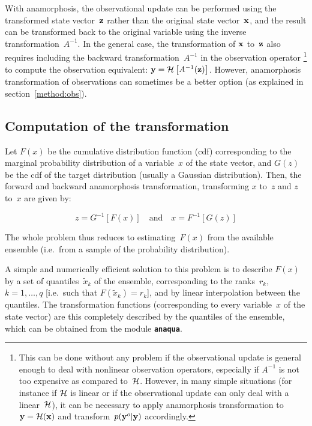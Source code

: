 \documentclass[11pt]{article}
\begin{document}
With anamorphosis, the observational update can be performed using the transformed state vector~${\bf z}$
rather than the original state vector~${\bf x}$, and the result can be transformed back
to the original variable using the inverse transformation~$A^{-1}$.
In the general case, the transformation of ${\bf x}$ to~${\bf z}$ also requires including
the backward transformation~$A^{-1}$ in the observation operator%
\footnote{This can be done without any problem if the observational update is general enough
to deal with nonlinear observation operators,
especially if $A^{-1}$ is not too expensive as compared to~${\cal H}$.
However, in many simple situations (for instance if ${\cal H}$ is linear
or if the observational update can only deal with a linear~${\cal H}$),
it can be necessary to apply anamorphosis transformation to~${\bf y} = {\cal H}({\bf x})$
and transform~$p({\bf y}^o|{\bf y})$ accordingly.}
to compute the observation equivalent: ${\bf y} = {\cal H} \left[ A^{-1} ({\bf z}) \right]$.
However, anamorphosis transformation of observations can sometimes be a better option
(as explained in section~\ref{method:obs}).

\subsection{Computation of the transformation}
\label{sec:defana}

Let $F(x)$ be the cumulative distribution function (cdf)
corresponding to the marginal probability distribution
of a variable~$x$ of the state vector, and $G(z)$
be the cdf of the target distribution
(usually a Gaussian distribution).
Then, the forward and backward anamorphosis transformation,
transforming $x$ to~$z$ and $z$ to~$x$ are given by:

\begin{equation}
z = G^{-1} \left[ F(x) \right]
\quad\mbox{and}\quad
x = F^{-1} \left[ G(z) \right]
\end{equation}

\noindent
The whole problem thus reduces to estimating~$F(x)$ from the available ensemble
(i.e.\ from a sample of the probability distribution).

A simple and numerically efficient solution to this problem
\citep[see][for more details]{BRAN12}
is to describe $F(x)$ by a set of quantiles~$\tilde{x}_k$ of the ensemble,
corresponding to the ranks~$r_k$, $k=1,\ldots,q$
[i.e.\ such that $F(\tilde{x}_k) = r_k$],
and by linear interpolation between the quantiles.
The transformation functions (corresponding to every variable~$x$ of the state vector)
are this completely described by the quantiles of the ensemble,
which can be obtained from the module {\tt\bf anaqua}.
\end{document}
